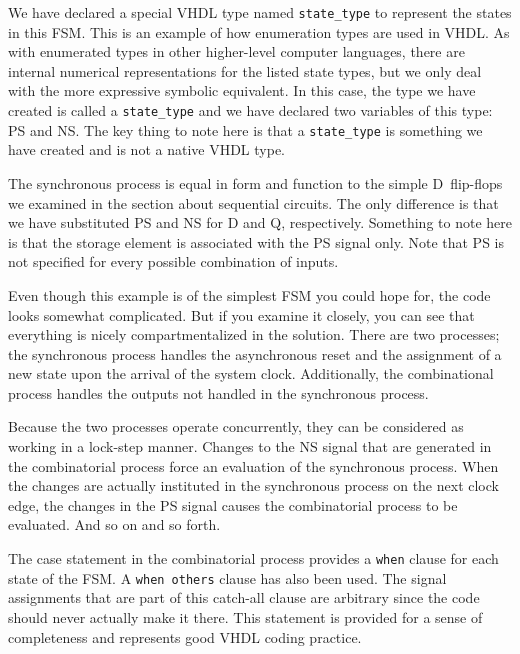 \begin{my_list}
\item We have declared a special VHDL type named \texttt{state\_type} to represent the states in this FSM. This is an example of how enumeration types are used in VHDL. As with enumerated types in other higher-level computer languages, there are internal numerical representations for the listed state types, but we only deal with the more expressive symbolic equivalent. In this case, the type we have created is called a \texttt{state\_type} and we have declared two variables of this type: PS and NS. The key thing to note here is that a \texttt{state\_type} is something we have created and is not a native VHDL type.

\item The synchronous process is equal in form and function to the simple D~flip-flops we examined in the section about sequential circuits. The only difference is that we have substituted PS and NS for D and Q, respectively. Something to note here is that the storage element is associated with the PS signal only. Note that PS is not specified for every possible combination of inputs.

\item Even though this example is of the simplest FSM you could hope for, the code looks somewhat complicated. But if you examine it closely, you can see that everything is nicely compartmentalized in the solution. There are two processes; the synchronous process handles the asynchronous reset and the assignment of a new state upon the arrival of the system clock. Additionally, the combinational process handles the outputs not handled in the synchronous process.

\item Because the two processes operate concurrently, they can be considered as working in a lock-step manner. Changes to the NS signal that are generated in the combinatorial process force an evaluation of the synchronous process. When the changes are actually instituted in the synchronous process on the next clock edge, the changes in the PS signal causes the combinatorial process to be evaluated. And so on and so forth.

\item The case statement in the combinatorial process provides a \texttt{when} clause for each state of the FSM. A \texttt{when others} clause has also been used. The signal assignments that are part of this catch-all clause are arbitrary since the code should never actually make it there. This statement is provided for a sense of completeness and represents good VHDL coding practice.


\end{my_list}
